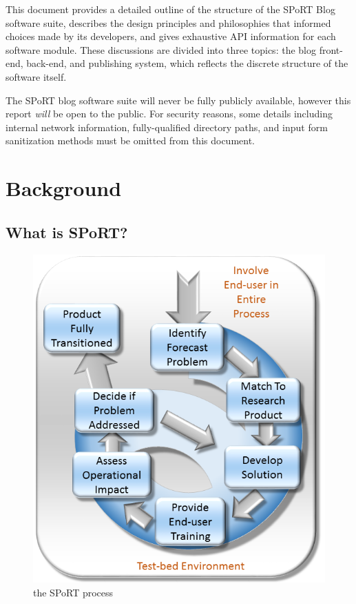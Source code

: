 \documentclass[12pt]{article}
\begin{document}
This document provides a detailed outline of the structure of the SPoRT Blog software suite, describes the design principles and philosophies that informed choices made by its developers, and gives exhaustive API information for each software module. These discussions are divided into three topics: the blog front-end, back-end, and publishing system, which reflects the discrete structure of the software itself.

The SPoRT blog software suite will never be fully publicly available, however this report \textit{will} be open to the public. For security reasons, some details including internal network information, fully-qualified directory paths, and input form sanitization methods must be omitted from this document.

\newpage
\section{Background}

\subsection{What is SPoRT?}

\begin{figure}
  \centering
  \includegraphics[width=\linewidth]{./figures/sport-process.png}
  \caption{the SPoRT process \cite{SPoRT18b}}
  \label{partners} %
\end{figure}
\end{document}
